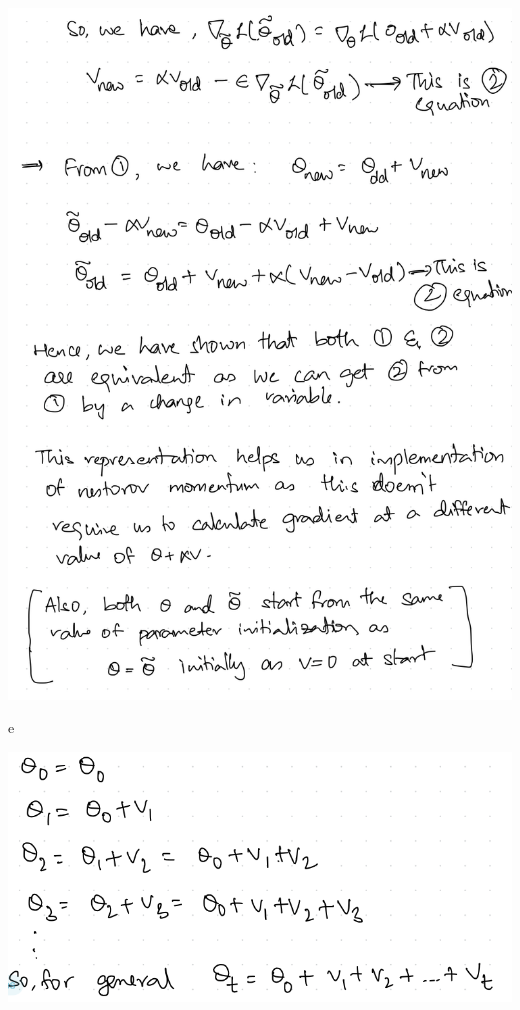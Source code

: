 \documentclass{article}
\renewcommand{\bf}[1]{\textbf{{#1}}}
\newcommand{\ul}[1]{\underline{{#1}}}
\newcommand{\tbu}{\bf{\ul{}}}
\begin{document}
\begin{minipage}{2.6in}
\includegraphics[scale=0.22]{mr52.png}

\tbu{e}

\includegraphics[scale=0.22]{mr5e1.png}



\end{minipage}
\end{document}

